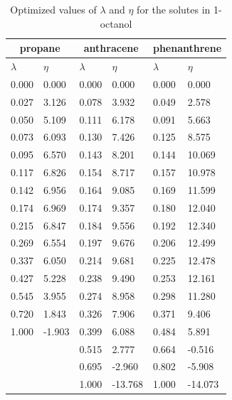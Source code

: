 \documentclass[
	12pt,				%
	openright,			%
	oneside,			%
	a4paper,			%
	english,			%
	brazil				%
	]{abntex2}
\begin{document}
\begin{apendicesenv}
\begin{table}[h]
	\centering
	\caption{Optimized values of $\lambda$ and $\eta$ for the solutes in 1-octanol}
	\begin{tabular}{llllll}
		\hline
		\multicolumn{2}{c}{propane}& \multicolumn{2}{c}{anthracene}& \multicolumn{2}{c}{phenanthrene}\\
		\hline
		$\lambda$ & $\eta$ & $\lambda$ & $\eta$  & $\lambda$ & $\eta$   \\ 
		\hline
0.000	&	0.000	&	0.000	&	0.000	&	0.000	&	0.000	\\
0.027	&	3.126	&	0.078	&	3.932	&	0.049	&	2.578	\\
0.050	&	5.109	&	0.111	&	6.178	&	0.091	&	5.663	\\
0.073	&	6.093	&	0.130	&	7.426	&	0.125	&	8.575	\\
0.095	&	6.570	&	0.143	&	8.201	&	0.144	&	10.069	\\
0.117	&	6.826	&	0.154	&	8.717	&	0.157	&	10.978	\\
0.142	&	6.956	&	0.164	&	9.085	&	0.169	&	11.599	\\
0.174	&	6.969	&	0.174	&	9.357	&	0.180	&	12.040	\\
0.215	&	6.847	&	0.184	&	9.556	&	0.192	&	12.340	\\
0.269	&	6.554	&	0.197	&	9.676	&	0.206	&	12.499	\\
0.337	&	6.050	&	0.214	&	9.681	&	0.225	&	12.478	\\
0.427	&	5.228	&	0.238	&	9.490	&	0.253	&	12.161	\\
0.545	&	3.955	&	0.274	&	8.958	&	0.298	&	11.280	\\
0.720	&	1.843	&	0.326	&	7.906	&	0.371	&	9.406	\\
1.000	&	-1.903	&	0.399	&	6.088	&	0.484	&	5.891	\\
&		&	0.515	&	2.777	&	0.664	&	-0.516	\\
&		&	0.695	&	-2.960	&	0.802	&	-5.908	\\
&		&	1.000	&	-13.768	&	1.000	&	-14.073	\\

		
		\hline
	\end{tabular}
\end{table}


\end{apendicesenv}
\end{document}
